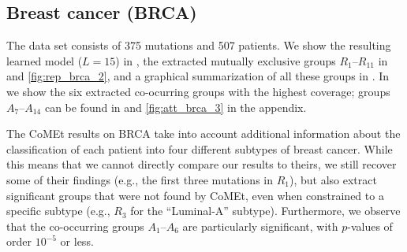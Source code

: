 \subsection{Breast cancer (BRCA)}
The data set consists of 375 mutations and 507 patients.
We show the resulting learned \fldc{} model ($L = 15$) in , the extracted mutually exclusive groups $R_1$--$R_{11}$ in  and \ref{fig:rep_brca_2}, and a graphical summarization of all these groups in .
In  we show the six extracted co-ocurring groups with the highest coverage; groups $A_7$--$A_{14}$ can be found in  and \ref{fig:att_brca_3} in the appendix.

The CoMEt results on BRCA take into account additional information about the classification of each patient into four different subtypes of breast cancer.
While this means that we cannot directly compare our results to theirs, we still recover some of their findings (e.g., the first three mutations in $R_1$), but also extract significant groups that were not found by CoMEt, even when constrained to a specific subtype (e.g., $R_3$ for the ``Luminal-A'' subtype).
Furthermore, we observe that the co-occurring groups $A_1$--$A_6$ are particularly significant, with $p$-values of order $10^{-5}$ or less.

